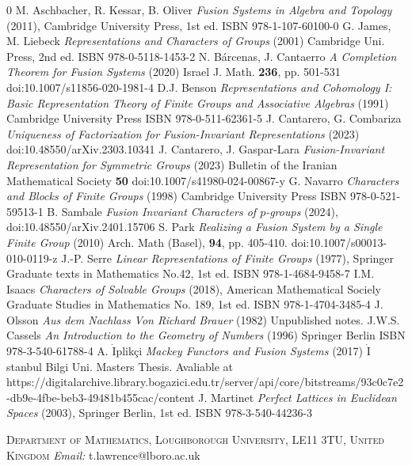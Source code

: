 \documentclass[12pt]{article}
\theoremstyle{plain}
\theoremstyle{definition}
\begin{document}
\begin{thebibliography}{0}
 M. Aschbacher, R. Kessar, B. Oliver \emph{Fusion Systems in Algebra and Topology} (2011), Cambridge University Press, 1st ed. ISBN 978-1-107-60100-0
 G. James, M. Liebeck \emph{Representations and Characters of Groups} (2001) Cambridge Uni. Press,  2nd ed. ISBN 978-0-5118-1453-2
N. B\'arcenas, J. Cantaerro \emph{A Completion Theorem for Fusion Systems} (2020) Israel J. Math. \textbf{236}, pp. 501-531  doi:10.1007/s11856-020-1981-4
D.J. Benson \emph{Representations and Cohomology I: Basic Representation Theory of Finite Groups and Associative Algebras} (1991) Cambridge University Press ISBN 978-0-511-62361-5 
 J. Cantarero, G. Combariza \emph{Uniqueness of Factorization for Fusion-Invariant Representations} (2023)  doi:10.48550/arXiv.2303.10341 
 J. Cantarero, J. Gaspar-Lara \emph{Fusion-Invariant Representation for Symmetric Groups} (2023) Bulletin of the Iranian Mathematical Society \textbf{50} doi:10.1007/s41980-024-00867-y
 G. Navarro \emph{Characters and Blocks of Finite Groups} (1998) Cambridge University Press ISBN  978-0-521-59513-1 
B. Sambale \emph{Fusion Invariant Characters of $p$-groups} (2024), doi:10.48550/arXiv.2401.15706 
 S. Park \emph{Realizing a Fusion System by a Single Finite Group} (2010) Arch. Math (Basel), \textbf{94}, pp. 405-410. doi:10.1007/s00013-010-0119-z
 J.-P. Serre \emph{Linear Representations of Finite Groups} (1977), Springer Graduate texts in Mathematics No.42, 1st ed. ISBN 978-1-4684-9458-7
 I.M. Isaacs \emph{Characters of Solvable Groups} (2018), American Mathematical Sociely Graduate Studies in Mathematics No. 189, 1st ed. ISBN 978-1-4704-3485-4
 J. Olsson \emph{Aus dem Nachlass Von Richard Brauer} (1982) Unpublished notes.
 J.W.S. Cassels \emph{An Introduction to the Geometry of Numbers} (1996) Springer Berlin ISBN 978-3-540-61788-4
 A. $\mathrm{\dot{I}}$plik\c{c}i \emph{Mackey Functors and Fusion Systems} (2017) $\mathrm{\dot{I}}$stanbul Bilgi Uni. Masters Thesis. Avaliable at https://digitalarchive.library.bogazici.edu.tr/server/api/core/bitstreams/93c0c7e2-db9e-4fbe-beb3-49481b455cac/content
 J. Martinet \emph{Perfect Lattices in Euclidean Spaces} (2003), Springer Berlin, 1st ed. ISBN 978-3-540-44236-3
\end{thebibliography}
\vspace*{0.5cm}
\textsc{Department of Mathematics, Loughborough University, LE11 3TU,  United Kingdom} 
\newline
\textit{Email:} t.lawrence@lboro.ac.uk
\end{document}
